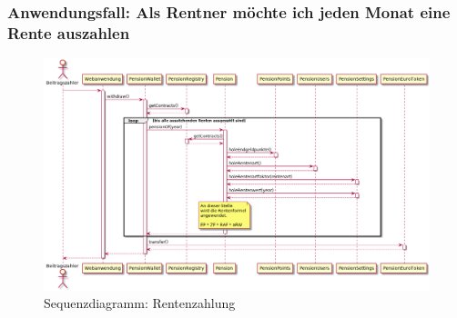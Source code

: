 \subsubsection{Anwendungsfall: Als Rentner möchte ich jeden Monat eine Rente auszahlen}

\begin{figure}[H]
    \centering
    \includegraphics[width=6.0in]{images/usecase-payout.png}
    \caption{Sequenzdiagramm: Rentenzahlung}
    \label{fig:asure_architecture}
\end{figure}